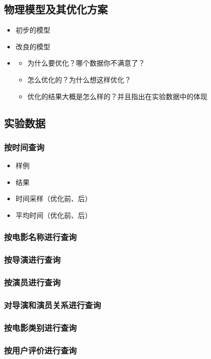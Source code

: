 \documentclass{ctexrep}
\begin{document}
	\subsection{物理模型及其优化方案}
	\begin{itemize}
		\item 初步的模型
		\item 改良的模型
		\item \begin{itemize}
			\item 为什么要优化？哪个数据你不满意了？
			\item 怎么优化的？为什么想这样优化？
			\item 优化的结果大概是怎么样的？并且指出在实验数据中的体现
		\end{itemize}
	\end{itemize}
	\subsection{实验数据}
	\subsubsection{按时间查询}
	\begin{itemize}
		\item 样例
		\item 结果
		\item 时间采样（优化前、后）
		\item 平均时间（优化前、后）
	\end{itemize}
	\subsubsection{按电影名称进行查询}
	\subsubsection{按导演进行查询}
	\subsubsection{按演员进行查询}
	\subsubsection{对导演和演员关系进行查询}
	\subsubsection{按电影类别进行查询}
	\subsubsection{按用户评价进行查询}
\end{document}
